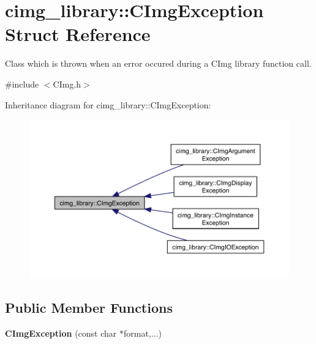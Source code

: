 \hypertarget{structcimg__library_1_1_c_img_exception}{\section{cimg\-\_\-library\-:\-:C\-Img\-Exception Struct Reference}
\label{structcimg__library_1_1_c_img_exception}
}


Class which is thrown when an error occured during a C\-Img library function call.  




{\ttfamily \#include $<$C\-Img.\-h$>$}



Inheritance diagram for cimg\-\_\-library\-:\-:C\-Img\-Exception\-:
\nopagebreak
\begin{figure}[H]
\begin{center}
\leavevmode
\includegraphics[width=350pt]{structcimg__library_1_1_c_img_exception__inherit__graph}
\end{center}
\end{figure}
\subsection*{Public Member Functions}
\begin{DoxyCompactItemize}
\item 
\hypertarget{structcimg__library_1_1_c_img_exception_af363fbdd7832f611d3da5c14befe2d25}{{\bfseries C\-Img\-Exception} (const char $\ast$format,...)}\label{structcimg__library_1_1_c_img_exception_af363fbdd7832f611d3da5c14befe2d25}

\end{DoxyCompactItemize}
